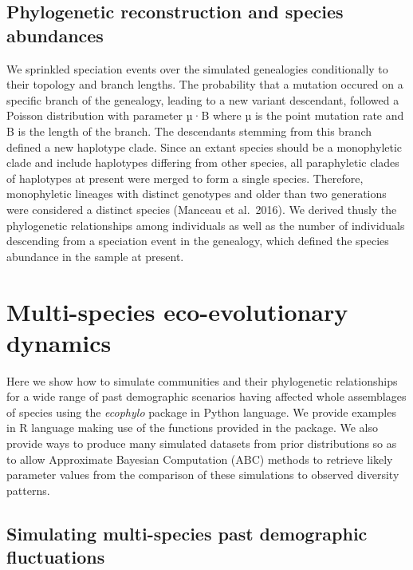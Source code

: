 \documentclass[
]{article}
\begin{document}
\hypertarget{phylogenetic-reconstruction-and-species-abundances}{%
\subsection{Phylogenetic reconstruction and species
abundances}\label{phylogenetic-reconstruction-and-species-abundances}}

We sprinkled speciation events over the simulated genealogies
conditionally to their topology and branch lengths. The probability that
a mutation occured on a specific branch of the genealogy, leading to a
new variant descendant, followed a Poisson distribution with parameter
µ·B where µ is the point mutation rate and B is the length of the
branch. The descendants stemming from this branch defined a new
haplotype clade. Since an extant species should be a monophyletic clade
and include haplotypes differing from other species, all paraphyletic
clades of haplotypes at present were merged to form a single species.
Therefore, monophyletic lineages with distinct genotypes and older than
two generations were considered a distinct species (Manceau et
al.~2016). We derived thusly the phylogenetic relationships among
individuals as well as the number of individuals descending from a
speciation event in the genealogy, which defined the species abundance
in the sample at present.

\hypertarget{multi-species-eco-evolutionary-dynamics}{%
\section{Multi-species eco-evolutionary
dynamics}\label{multi-species-eco-evolutionary-dynamics}}

Here we show how to simulate communities and their phylogenetic
relationships for a wide range of past demographic scenarios having
affected whole assemblages of species using the \emph{ecophylo} package
in Python language. We provide examples in R language making use of the
functions provided in the package. We also provide ways to produce many
simulated datasets from prior distributions so as to allow Approximate
Bayesian Computation (ABC) methods to retrieve likely parameter values
from the comparison of these simulations to observed diversity patterns.

\hypertarget{simulating-multi-species-past-demographic-fluctuations}{%
\subsection{Simulating multi-species past demographic
fluctuations}\label{simulating-multi-species-past-demographic-fluctuations}}
\end{document}
